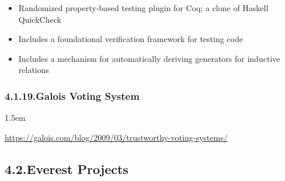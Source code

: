 \documentclass[12pt,twoside]{article}
\begin{document}
\begin{itemize}[noitemsep,topsep=\mdcompacttopsep]%

\item{}Randomized property-based testing plugin for Coq; a clone of Haskell QuickCheck%

\item{}Includes a foundational verification framework for testing code%

\item{}Includes a mechanism for automatically deriving generators for inductive relations%
\end{itemize}%

\subsubsection{4.1.19.\hspace*{0.5em}Galois Voting System}\label{sec-galois-voting-system}%

\begin{mddefinitions}%


\begin{mdbmarginx}{}{}{}{1.5em}%
\begin{mddefdata}%
\href{https://galois.com/blog/2009/03/trustworthy-voting-systems/}{{\ttfamily https://\hspace{0pt}galois.\hspace{0pt}com/\hspace{0pt}blog/\hspace{0pt}2009/\hspace{0pt}03/\hspace{0pt}trustworthy-\hspace{0pt}voting-\hspace{0pt}systems/\hspace{0pt}}}%
\end{mddefdata}%
\end{mdbmarginx}%
\end{mddefinitions}%

\subsection{4.2.\hspace*{0.5em}Everest Projects}\label{sec-everest-projects}%
\end{document}
